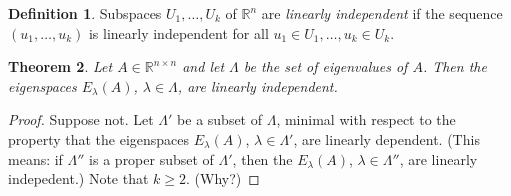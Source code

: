 \documentclass[fullpage]{amsart}
\newcommand{\RR}{\mathbb{R}}
\newtheorem{theorem}{Theorem}[section]
\theoremstyle{definition}
\newtheorem{definition}[theorem]{Definition}
\begin{document}
\begin{definition}
  Subspaces $U_1,\ldots,U_k$ of $\RR^n$ are \emph{linearly independent} if the sequence $(u_1,\ldots, u_k)$ is linearly independent for all $u_1\in U_1,\ldots,u_k\in U_k$. 
\end{definition}

\begin{theorem}
  Let $A\in\RR^{n\times n}$ and let $\Lambda$ be the set of eigenvalues of $A$.
  Then the eigenspaces $E_\lambda(A)$, $\lambda\in \Lambda$, are linearly independent.
  
\end{theorem}
\begin{proof}
  Suppose not.
  Let $\Lambda'$ be a subset of $\Lambda$, minimal with respect to the property that the eigenspaces $E_\lambda(A)$, $\lambda\in \Lambda'$, are linearly dependent.
  (This means: if $\Lambda''$ is a proper subset of $\Lambda'$, then the $E_\lambda(A)$, $\lambda\in \Lambda''$, are linearly indepedent.)
  Note that $k\geq 2$. (Why?)


\end{proof}
\end{document}
